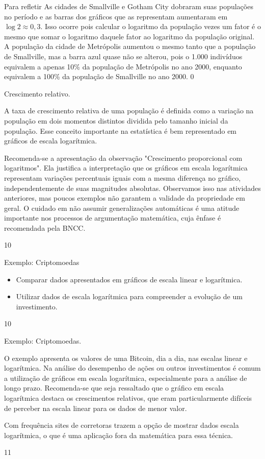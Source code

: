 \begin{answer}{Para refletir}
{As cidades de Smallville e Gotham City dobraram suas populações no período e as barras dos gráficos que as representam aumentaram em $\log 2 \approx 0{,}3$. Isso ocorre pois calcular o logaritmo da população vezes um fator é o mesmo que somar o logaritmo daquele fator ao logaritmo da população original. A população da cidade de Metrópolis aumentou o mesmo tanto que a população de Smallville, mas a barra azul quase não se alterou, pois o 1.000 indivíduos equivalem a apenas 10\% da população de Metrópolis no ano 2000, enquanto equivalem a 100\% da população de Smallville no ano 2000.}
{0}
\end{answer}
\begin{sugestions}{Crescimento relativo.}
{A taxa de crescimento relativa de uma população é definida como a variação na população em dois momentos distintos dividida pelo tamanho inicial da população. Esse conceito importante na estatística é bem representado em gráficos de escala logarítmica.

Recomenda-se a apresentação da observação "Crescimento proporcional com logaritmos". Ela justifica a interpretação que os gráficos em escala logarítmica representam variações percentuais iguais com a mesma diferença no gráfico, independentemente de suas magnitudes absolutas. Observamos isso nas atividades anteriores, mas poucos exemplos não garantem a validade da propriedade em geral. O cuidado em não assumir generalizações automáticas é uma atitude importante nos processos de argumentação matemática, cuja ênfase é recomendada pela BNCC.}
{1}{0}
\end{sugestions}
\begin{objectives}{Exemplo: Criptomoedas}
{\begin{itemize}
\item Comparar dados apresentados em gráficos de escala linear e logarítmica.
\item Utilizar dados de escala logarítmica para compreender a evolução de um investimento.
\end{itemize}}
{1}{0}
\end{objectives}
\clearmargin
\begin{sugestions}{Exemplo: Criptomoedas.}
{O exemplo apresenta os valores de uma Bitcoin, dia a dia, nas escalas linear e logarítmica. Na análise do desempenho de ações ou outros investimentos é comum a utilização de gráficos em escala logarítmica, especialmente para a análise de longo prazo. Recomenda-se que seja ressaltado que o gráfico em escala logarítmica destaca os crescimentos relativos, que eram particularmente difíceis de perceber na escala linear para os dados de menor valor.

Com frequência sites de corretoras trazem a opção de mostrar dados escala logarítmica, o que é uma aplicação fora da matemática para essa técnica.}
{1}{1}
\end{sugestions}

